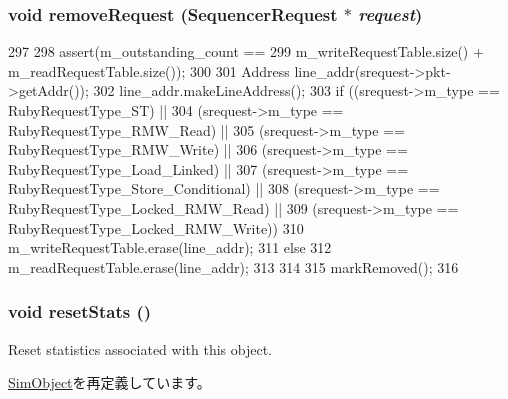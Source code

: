 \hypertarget{classSequencer_a525e0db39943b198c53fc6e8356f6050}{
\subsubsection[{removeRequest}]{\setlength{\rightskip}{0pt plus 5cm}void removeRequest ({\bf SequencerRequest} $\ast$ {\em request})}}
\label{classSequencer_a525e0db39943b198c53fc6e8356f6050}



\begin{DoxyCode}
297 {
298     assert(m_outstanding_count ==
299            m_writeRequestTable.size() + m_readRequestTable.size());
300 
301     Address line_addr(srequest->pkt->getAddr());
302     line_addr.makeLineAddress();
303     if ((srequest->m_type == RubyRequestType_ST) ||
304         (srequest->m_type == RubyRequestType_RMW_Read) ||
305         (srequest->m_type == RubyRequestType_RMW_Write) ||
306         (srequest->m_type == RubyRequestType_Load_Linked) ||
307         (srequest->m_type == RubyRequestType_Store_Conditional) ||
308         (srequest->m_type == RubyRequestType_Locked_RMW_Read) ||
309         (srequest->m_type == RubyRequestType_Locked_RMW_Write)) {
310         m_writeRequestTable.erase(line_addr);
311     } else {
312         m_readRequestTable.erase(line_addr);
313     }
314 
315     markRemoved();
316 }
\end{DoxyCode}
\hypertarget{classSequencer_a65880e61108132689a1bd769b9187fb7}{
\subsubsection[{resetStats}]{\setlength{\rightskip}{0pt plus 5cm}void resetStats ()}}
\label{classSequencer_a65880e61108132689a1bd769b9187fb7}
Reset statistics associated with this object. 

\hyperlink{classSimObject_a65880e61108132689a1bd769b9187fb7}{SimObject}を再定義しています。


